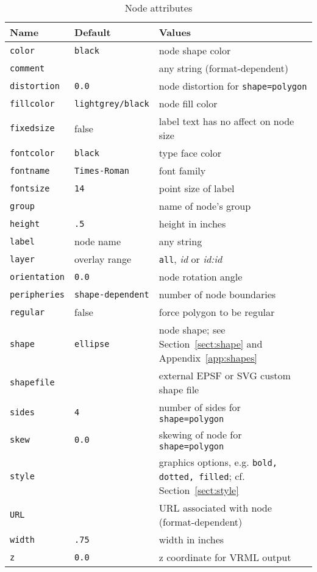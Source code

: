 \documentclass[11pt]{article}
\begin{document}
\begin{table}[p]
\begin{tabular}[t]{|l|l|p{3.0in}|} \hline
Name & Default & Values \\ \hline
{\tt color} & {\tt black} & node shape color \\
{\tt comment} & & any string (format-dependent) \\
{\tt distortion} & {\tt 0.0} & node distortion for {\tt shape=polygon} \\
{\tt fillcolor} & {\tt lightgrey/black} & node fill color \\
{\tt fixedsize} & false & label text has no affect on node size \\
{\tt fontcolor} & {\tt black} & type face color \\
{\tt fontname} & {\tt Times-Roman} & font family \\
{\tt fontsize} & {\tt 14} & point size of label \\
{\tt group} &  & name of node's group \\
{\tt height} & {\tt .5} & height in inches \\
{\tt label} & node name & any string \\
{\tt layer} & overlay range & {\tt all}, {\it id} or {\it id:id} \\
{\tt orientation} & {\tt 0.0} & node rotation angle \\
{\tt peripheries} & {\tt shape-dependent} & number of node boundaries \\
{\tt regular} & false & force polygon to be regular \\
{\tt shape} & {\tt ellipse} & node shape; see Section~\ref{sect:shape} and
Appendix~\ref{app:shapes}\\
{\tt shapefile} & & external EPSF or SVG custom shape file\\
{\tt sides} & {\tt 4} & number of sides for {\tt shape=polygon} \\
{\tt skew} & {\tt 0.0} & skewing of node for {\tt shape=polygon} \\
{\tt style} & & graphics options, e.g. {\tt bold, dotted, filled};
cf. Section~\ref{sect:style} \\ 
{\tt URL} & & URL associated with node (format-dependent) \\
{\tt width} & {\tt .75} & width in inches \\
{\tt z} & {\tt 0.0} & z coordinate for VRML output \\
\hline
\end{tabular}
\caption{Node attributes}
\label{tab:nattr}
\end{table}
\end{document}
